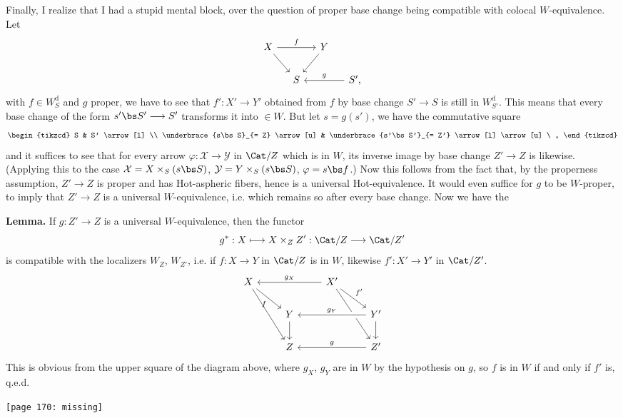 \noindent{}%
Finally, I realize that I had a stupid mental block, over the question of proper base change being compatible with colocal $W$-equivalence. Let
\[
\begin{tikzcd}[column sep=small]
X \arrow[rr, "f"] \arrow[dr] & & Y \arrow[dl] & \\
& S & & S', \arrow[ll, "g"']
\end{tikzcd}
\]
with $f \in W^{\mathrm{d}}_{S}$ and $g$ proper, we have to see that $f' : X' \longrightarrow Y'$ obtained from $f$ by base change $S' \longrightarrow S$ is still in $W^{\mathrm{d}}_{S'}$. This means that every base change of the form $s'\bs S' \longrightarrow S'$ transforms it into $\in W$. But let $s = g(s')$, we have the commutative square
\[
\begin{tikzcd}
S & S' \arrow[l] \\
\underbrace{s\bs S}_{= Z} \arrow[u] & \underbrace{s'\bs S'}_{= Z'} \arrow[l] \arrow[u] \ ,
\end{tikzcd}
\]
and it suffices to see that for every arrow $\varphi : \mathcal{X} \longrightarrow \mathcal{Y}$ in $\Cat/Z$ which is in $W$, its inverse image by base change $Z' \longrightarrow Z$ is likewise. (Applying this to the case $\mathcal{X} = X \times_S (s\bs S)$, $\mathcal{Y} = Y \times_S (s\bs S)$, $\varphi = s\bs f$.) Now this follows from the fact that, by the properness assumption, $Z' \longrightarrow Z$ is proper and has Hot-aspheric fibers, hence is a universal Hot-equivalence. It would even suffice for $g$ to be $W$-proper, to imply that $Z' \longrightarrow Z$ is a universal $W$-equivalence, i.e. which remains so after every base change. Now we have the

\noindent\textbf{Lemma.} If $g : Z' \longrightarrow Z$ is a universal $W$-equivalence, then the functor
\[
g^* : X \longmapsto X \times_Z Z' : \Cat/Z \longrightarrow \Cat/Z'
\]
is compatible with the localizers $W_Z$, $W_{Z'}$, i.e. if $f : X \longrightarrow Y$ in $\Cat/Z$ is in $W$, likewise $f' : X' \longrightarrow Y'$ in $\Cat/Z'$.
\[
\begin{tikzcd}
X \arrow[dr, "f"'] \arrow[ddr] & & X' \arrow[ll, "g_X"'] \arrow[dr, "f'"] \arrow[ddr] & \\
& Y \arrow[d] & & Y' \arrow[ll, "g_Y"', crossing over] \arrow[d] \\
& Z & & Z' \arrow[ll, "g"']
\end{tikzcd}
\]
This is obvious from the upper square of the diagram above, where $g_X$, $g_Y$ are in $W$ by the hypothesis on $g$, so $f$ is in $W$ if and only if $f'$ is, q.e.d. %

\texttt{[page 170: missing]}